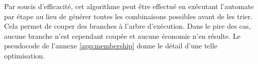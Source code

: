 Par soucis d'efficacité, cet algorithme peut être effectué en exécutant l'automate par étape au lieu de générer toutes les combinaisons possibles avant de les trier. Cela permet de couper des branches à l'arbre d'exécution. Dans le pire des cas, aucune branche n'est cependant coupée et aucune économie n'en résulte. Le pseudocode de l'annexe \ref{app:membership} donne le détail d'une telle optimisation.
